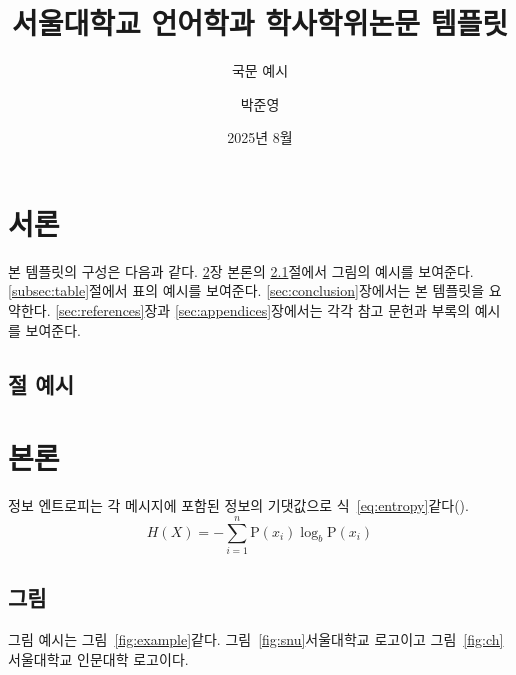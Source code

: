 \documentclass[ko]{snu-ling-ba-thesis}
\title{서울대학교 언어학과 학사학위논문 템플릿}
\subtitle{국문 예시}
\author{박준영}
\affil{서울대학교 인문대학 언어학과}
\date{2025년 8월}
\begin{document}
\maketitle

\begin{abstract}
  \jiwon[1]
\end{abstract}


\tableofcontents


\section{서론}\label{sec:introduction}

본 템플릿의 구성은 다음과 같다.
\ref{sec:body}장 본론의 \ref{subsec:picture}절에서 그림의 예시를 보여준다.
\ref{subsec:table}절에서 표의 예시를 보여준다.
\ref{sec:conclusion}장에서는 본 템플릿을 요약한다.
\ref{sec:references}장과 \ref{sec:appendices}장에서는 각각 참고 문헌과 부록의 예시를 보여준다.

\subsection{절 예시}\label{subsec:section}
\jiwon[2-3]


\section{본론}\label{sec:body}
정보 엔트로피는 각 메시지에 포함된 정보의 기댓값으로 식~\eqref{eq:entropy}\와 같다(\cite{sha48}).
\begin{equation}\label{eq:entropy}
  H(X) = -\sum_{i=1}^n {\mathrm{P}(x_i) \log_b \mathrm{P}(x_i)}
\end{equation}

\jiwon[4-6]


\subsection{그림}\label{subsec:picture}
그림 예시는 그림~\ref{fig:example}\와 같다.
그림~\ref{fig:snu}\은 서울대학교 로고이고 그림~\ref{fig:ch}\는 서울대학교 인문대학 로고이다.
\end{document}
